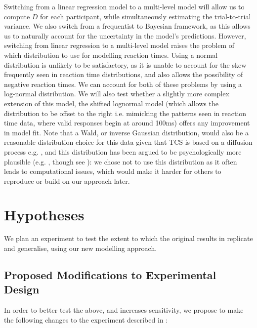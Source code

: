 \documentclass[preprint,12pt,authoryear]{elsarticle}
\begin{document}
Switching from a linear regression model to a multi-level model will allow us to compute $D$ for each participant, while simultaneously estimating the trial-to-trial variance. We also switch from a frequentist to Bayesian framework, as this allows us to naturally account for the uncertainty in the model’s predictions. However, switching from linear regression to a multi-level model raises the problem of which distribution to use for modelling reaction times. Using a normal distribution is unlikely to be satisfactory, as it is unable to account for the skew frequently seen in reaction time distributions, and also allows the possibility of negative reaction times. We can account for both of these problems by using a log-normal distribution. We will also test whether a slightly more complex extension of this model, the shifted lognormal model (which allows the distribution to be offset to the right i.e. mimicking the patterns seen in reaction time data, where valid responses begin at around 100ms) offers any improvement in model fit. Note that a Wald, or inverse Gaussian distribution, would also be a reasonable distribution choice for this data given that TCS is based on a diffusion process e.g. \citep{moran2013competitive}, and this distribution has been argued to be psychologically more plausible (e.g. \cite{kieffaber2006switch}, though see \cite{matzke2009psychological}): we chose not to use this distribution as it often leads to computational issues, which would make it harder for others to reproduce or build on our approach later.

\section{Hypotheses}

We plan an experiment to test the extent to which the original results in \cite{buetti2019predicting} replicate and generalise, using our new modelling approach.

\subsection{Proposed Modifications to Experimental Design}

In order to better test the above, and increases sensitivity, we propose to make the following changes to the experiment described in \cite{buetti2019predicting}:
\end{document}
